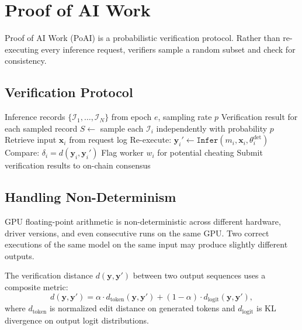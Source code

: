 \section{Proof of AI Work}

\label{sec:poai}

Proof of AI Work (PoAI) is a probabilistic verification protocol. Rather than
re-executing every inference request, verifiers sample a random subset and check
for consistency.

\subsection{Verification Protocol}

\begin{algorithm}
\caption{Proof of AI Work Verification}
\label{alg:poai}
\begin{algorithmic}[1]
\Require Inference records $\{\mathcal{I}_1, \ldots, \mathcal{I}_N\}$ from
    epoch $e$, sampling rate $p$
\Ensure Verification result for each sampled record
\State $S \leftarrow$ sample each $\mathcal{I}_i$ independently with
    probability $p$
    \State Retrieve input $\mathbf{x}_i$ from request log
    \State Re-execute: $\mathbf{y}_i' \leftarrow \texttt{Infer}(m_i,
        \mathbf{x}_i, \theta_i^{\text{det}})$
    \State Compare: $\delta_i = d(\mathbf{y}_i, \mathbf{y}_i')$
        \State Flag worker $w_i$ for potential cheating
    \EndIf
\EndFor
\State Submit verification results to on-chain consensus
\end{algorithmic}
\end{algorithm}

\subsection{Handling Non-Determinism}

GPU floating-point arithmetic is non-deterministic across different hardware,
driver versions, and even consecutive runs on the same GPU. Two correct
executions of the same model on the same input may produce slightly different
outputs.

\begin{definition}
The verification distance $d(\mathbf{y}, \mathbf{y}')$ between two output
sequences uses a composite metric:
\begin{equation}
d(\mathbf{y}, \mathbf{y}') = \alpha \cdot d_{\text{token}}(\mathbf{y},
\mathbf{y}') + (1 - \alpha) \cdot d_{\text{logit}}(\mathbf{y}, \mathbf{y}'),
\end{equation}
where $d_{\text{token}}$ is normalized edit distance on generated tokens and
$d_{\text{logit}}$ is KL divergence on output logit distributions.
\end{definition}

